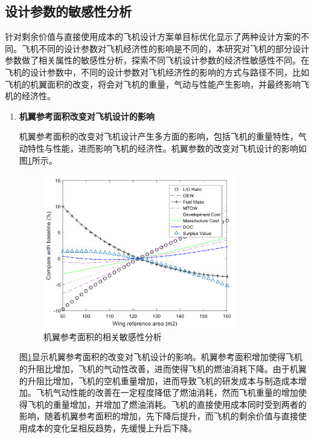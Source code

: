 \documentclass[12pt,a4paper]{report}
\begin{document}
\subsection{设计参数的敏感性分析}
针对剩余价值与直接使用成本的飞机设计方案单目标优化显示了两种设计方案的不同。飞机不同的设计参数对飞机经济性的影响是不同的，本研究对飞机的部分设计参数做了相关属性的敏感性分析，探索不同飞机设计参数的经济性敏感性不同。在飞机的设计参数中，不同的设计参数对飞机经济性的影响的方式与路径不同，比如飞机的机翼面积的改变，将会对飞机的重量，气动与性能产生影响，并最终影响飞机的经济性。

\begin{enumerate}
\item \textbf{机翼参考面积改变对飞机设计的影响}

机翼参考面积的改变对飞机设计产生多方面的影响，包括飞机的重量特性，气动特性与性能，进而影响飞机的经济性。机翼参数的改变对飞机设计的影响如图\ref{fig:wingarea}所示。

\begin{figure}[htp]
  \centering
  \includegraphics[width=0.8\textwidth]{./media4/wingarea.png}
  \caption{机翼参考面积的相关敏感性分析}
  \label{fig:wingarea}
\end{figure}

图\ref{fig:wingarea}显示机翼参考面积的改变对飞机设计的影响。机翼参考面积增加使得飞机的升阻比增加，飞机的气动性改善，进而使得飞机的燃油消耗下降。由于机翼的升阻比增加，飞机的空机重量增加，进而导致飞机的研发成本与制造成本增加。飞机气动性能的改善在一定程度降低了燃油消耗，然而飞机重量的增加使得飞机的重量增加，并增加了燃油消耗。飞机的直接使用成本同时受到两者的影响，随着机翼参考面积的增加，先下降后提升，而飞机的剩余价值与直接使用成本的变化呈相反趋势，先缓慢上升后下降。


\end{enumerate}
\end{document}
